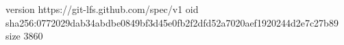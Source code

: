 version https://git-lfs.github.com/spec/v1
oid sha256:0772029dab34abdbe0849bf3d45e0fb2f2dfd52a7020aef1920244d2e7c27b89
size 3860

